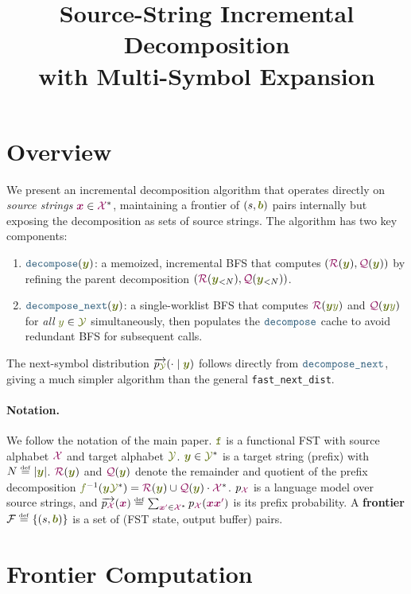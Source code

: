 \documentclass{article}
\title{Source-String Incremental Decomposition\\with Multi-Symbol Expansion}
\author{}
\date{}
\theoremstyle{plain}
\newcommand{\mymacro}[1]{#1}
\newcommand{\defn}[1]{\textbf{#1}}
\newcommand{\defeq}{\mathrel{\overset{\raisebox{-0.25ex}{\textnormal{\tiny def}}}{=}}}
\newcommand{\Quotient}{{\color{TokenColor}\mathcal{Q}}}
\newcommand{\Remainder}{{\color{TokenColor}\mathcal{R}}}
\newcommand{\transFnSym}[0]{f}
\newcommand{\transFn}{\ensuremath{{\color{CharacterColor}\transFnSym}}\xspace}
\newcommand{\srcStr}{\ensuremath{{\color{TokenColor}\boldsymbol{x}}}\xspace}
\newcommand{\srcStrp}[0]{{\color{TokenColor}\srcStr^\prime}}
\newcommand{\tgtSym}{{\color{CharacterColor}y}}
\newcommand{\tgtStr}{{\color{CharacterColor}\boldsymbol{y}}}
\newcommand{\pSource}{\mymacro{p_{\srcAlphabet}}}
\newcommand{\pTarget}{\mymacro{p_{\tgtAlphabet}}}
\newcommand{\prefixLanguageOp}[1]{\overrightarrow{#1}}
\newcommand{\prefixSource}{{\mymacro{\prefixLanguageOp{\pSource}}}}
\newcommand{\prefixTarget}{{\mymacro{\prefixLanguageOp{\pTarget}}}}
\newcommand{\srcAlphabet}[0]{{\color{TokenColor}\ensuremath{\mathcal{X}}}\xspace}
\newcommand{\tgtAlphabet}[0]{{\color{CharacterColor}\ensuremath{\mathcal{Y}}}\xspace}
\newcommand{\srcStrings}[0]{\ensuremath{\srcAlphabet^*}\xspace}
\newcommand{\tgtStrings}[0]{\ensuremath{\tgtAlphabet^*}\xspace}
\newcommand{\transST}{{\color{CharacterColor}\texttt{f}}}
\newcommand{\state}{\mymacro{s}}
\newcommand{\frontier}{\mathcal{F}}
\newcommand{\buffer}{{\color{CharacterColor}\boldsymbol{b}}}
\newcommand{\myMintedFunc}[1]{\mbox{\texttt{{\color{StormBlue}#1}}}}
\newcommand{\decompose}[0]{\myMintedFunc{decompose}}
\newcommand{\decomposeNext}[0]{\myMintedFunc{decompose\_next}}
\begin{document}
\maketitle

\section{Overview}

We present an incremental decomposition algorithm that operates directly on
\emph{source strings} $\srcStr \in \srcStrings$, maintaining a frontier of
$(\state, \buffer)$ pairs internally but exposing the decomposition as sets of
source strings.
The algorithm has two key components:
\begin{enumerate}
\item $\decompose(\tgtStr)$: a memoized, incremental BFS that computes
  $(\Remainder(\tgtStr), \Quotient(\tgtStr))$ by refining the parent
  decomposition $(\Remainder(\tgtStr_{<N}), \Quotient(\tgtStr_{<N}))$.
\item $\decomposeNext(\tgtStr)$: a single-worklist BFS that computes
  $\Remainder(\tgtStr\tgtSym)$ and $\Quotient(\tgtStr\tgtSym)$ for \emph{all}
  $\tgtSym \in \tgtAlphabet$ simultaneously, then populates the $\decompose$
  cache to avoid redundant BFS for subsequent calls.
\end{enumerate}
The next-symbol distribution $\prefixTarget(\cdot \mid \tgtStr)$ follows
directly from $\decomposeNext$, giving a much simpler algorithm than the
general \texttt{fast\_next\_dist}.

\paragraph{Notation.}
We follow the notation of the main paper.
$\transST$ is a functional FST with source alphabet $\srcAlphabet$ and target
alphabet $\tgtAlphabet$.
$\tgtStr \in \tgtStrings$ is a target string (prefix) with $N \defeq |\tgtStr|$.
$\Remainder(\tgtStr)$ and $\Quotient(\tgtStr)$ denote the remainder and
quotient of the prefix decomposition
$\transFn^{-1}(\tgtStr\tgtStrings) = \Remainder(\tgtStr) \cup
\Quotient(\tgtStr) \cdot \srcStrings$.
$\pSource$ is a language model over source strings, and
$\prefixSource(\srcStr) \defeq \sum_{\srcStrp \in \srcStrings}
\pSource(\srcStr\srcStrp)$ is its prefix probability.
A \defn{frontier} $\frontier \defeq \{(\state, \buffer)\}$ is a set of
(FST state, output buffer) pairs.


\section{Frontier Computation}
\label{sec:frontier}
\end{document}
